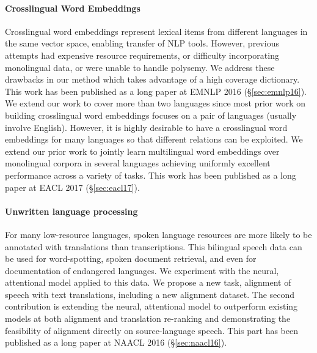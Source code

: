 \documentclass[12pt,twoside,final,hidelinks]{ltthesis}
\theoremstyle{definition}
\newcommand\naaclvi{NAACL 2016 (\S\ref{sec:naacl16})}
\newcommand\emnlpvi{EMNLP 2016 (\S\ref{sec:emnlp16})}
\newcommand\eaclvii{EACL 2017 (\S\ref{sec:eacl17})}
\begin{document}
\paragraph{Crosslingual Word Embeddings}
Crosslingual word embeddings represent lexical items from different languages in the same vector space, enabling transfer of NLP tools. 
However, previous attempts had %
expensive resource requirements, or difficulty incorporating monolingual data, or were unable to handle polysemy.
We address these drawbacks in our method which takes advantage of a high coverage dictionary. %
This work has been published as a long paper at \emnlpvi. We extend our work to cover more than two languages since most prior work on building crosslingual word embeddings focuses on a pair of languages (usually involve English).
However, it is highly desirable to have a crosslingual word embeddings for many languages so that different relations can be exploited. 
We extend our prior work to jointly learn multilingual word embeddings over monolingual corpora in several languages achieving uniformly excellent performance across a variety of tasks. This work has been published as a long paper at \eaclvii.

\paragraph{Unwritten language processing} For many low-resource languages, spoken language resources are more likely to be annotated with translations than 
transcriptions. This bilingual speech data can be used for word-spotting, spoken document retrieval, and even for documentation of endangered languages.
We experiment with the neural, attentional model applied to this data. 
We propose a new task, alignment of speech with text translations, including a new alignment dataset. The second contribution is extending the neural, attentional model to outperform existing models at both alignment and translation re-ranking and demonstrating the feasibility of alignment directly on source-language speech. This part has been published as a long paper at \naaclvi. 
\end{document}
